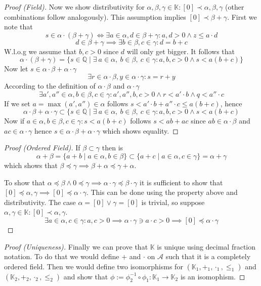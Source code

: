 \begin{proof}[Proof (Field)]
   Now we show distributivity for \(\alpha, \beta, \gamma \in \mathbb{K}: [0] \prec \alpha, \beta, \gamma\) (other combinations follow analogously).
   This assumption implies \([0] \prec \beta + \gamma\).
   First we note that
   \[s \in \alpha \cdot (\beta + \gamma) \iff \exists a \in \alpha, d \in \beta + \gamma: a, d > 0 \land z \leq a \cdot d\]
   \[d \in \beta + \gamma \implies \exists b \in \beta, c \in \gamma: d = b + c\]
   W.l.o.g we assume that \(b, c > 0\) since \(d\) will only get bigger.
   It follows that
   \[\alpha \cdot (\beta + \gamma) = \{s \in \mathbb{Q} \mid \exists~a \in \alpha,~b \in \beta,~c \in \gamma: a, b, c > 0 \land s < a(b + c)\}\]
   Now let \(s \in \alpha \cdot \beta + \alpha \cdot \gamma\)
   \[\exists r \in \alpha \cdot \beta, y \in \alpha \cdot \gamma: s = r + y\]
   According to the definition of \(\alpha \cdot \beta\) and \(\alpha \cdot \gamma\)
   \[\exists a', a'' \in \alpha, b \in \beta, c \in \gamma: a', a'', b, c > 0 \land r < a' \cdot b \land q < a'' \cdot c\]
   If we set \(a = \max(a', a'') \in \alpha\) follows \(s < a' \cdot b + a'' \cdot c \leq a(b + c)\), hence
   \[\alpha \cdot \beta + \alpha \cdot \gamma \subset \{s \in \mathbb{Q} \mid \exists~a \in \alpha,~b \in \beta,~c \in \gamma: a, b, c > 0 \land s < a(b + c)\]
      Now if \(a \in \alpha, b \in \beta, c \in \gamma: s < a(b + c)\) follows \(s < ab + ac\) since \(ab \in \alpha \cdot \beta\) and \(ac \in \alpha \cdot \gamma\) hence \(s \in \alpha \cdot \beta + \alpha \cdot \gamma\) which shows equality.
\end{proof}
\begin{proof}[Proof (Ordered Field)]
   If \(\beta \subset \gamma\) then is
   \[\alpha + \beta = \{a + b \mid a \in \alpha, b \in \beta\} \subset \{a + c \mid a \in \alpha, c \in \gamma\} = \alpha + \gamma\]
   which shows that \(\beta \preceq \gamma \implies \beta + \alpha \preceq \gamma + \alpha\).

   To show that \(\alpha \preceq \beta \land 0 \preceq \gamma \implies \alpha \cdot \gamma \preceq \beta \cdot \gamma\) it is sufficient to show that \([0] \preceq \alpha, \gamma \implies [0] \preceq \alpha \cdot \gamma\).
   This can be done using the property above and distributivity.
   The case \(\alpha = [0] \lor \gamma = [0]\) is trivial, so suppose \(\alpha, \gamma \in \mathbb{K}: [0] \prec \alpha, \gamma\).
   \[\exists a \in \alpha, c \in \gamma: a, c > 0 \implies \alpha \cdot \gamma \ni a \cdot c > 0 \implies [0] \preceq \alpha \cdot \gamma\]
\end{proof}
\begin{proof}[Proof (Uniqueness)]
   Finally we can prove that \(\mathbb{K}\) is unique using decimal fraction notation.
   To do that we would define \(+\) and \(\cdot\) on \(\mathcal{A}\) such that it is a completely ordered field.
   Then we would define two isomorphisms for \((\mathbb{K}_1, +_1, \cdot_1, \leq_1)\) and  \((\mathbb{K}_2, +_2, \cdot_2, \leq_2)\)
   and show that \(\phi := \phi_2^{-1} \circ \phi_1: \mathbb{K}_1 \to \mathbb{K}_2\) is an isomophism.
\end{proof}


